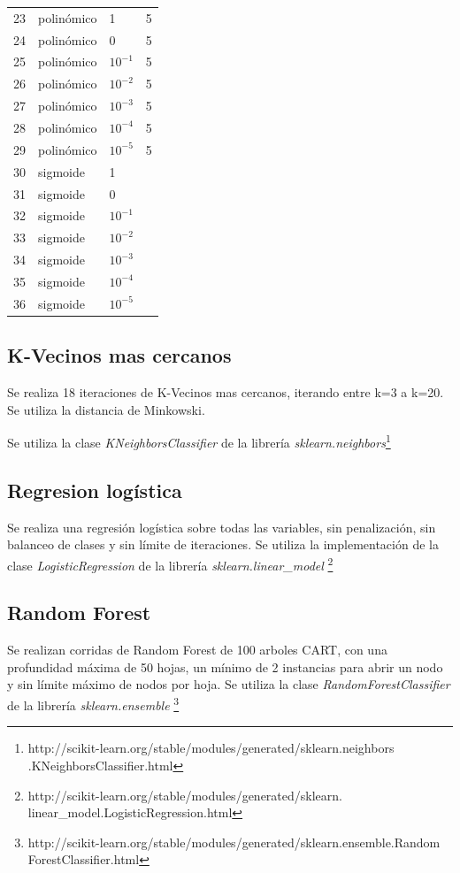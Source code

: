 \documentclass[journal]{IEEEtran}
\begin{document}
\begin{table}[ht!]
\begin{tabular}{l | l l l }
23 & polinómico & 1  & 5 \\ 
24 & polinómico & 0  & 5 \\ 
25 & polinómico & $ 10^{-1} $  & 5 \\ 
26 & polinómico & $ 10^{-2} $  & 5 \\ 
27 & polinómico & $ 10^{-3} $  & 5 \\ 
28 & polinómico & $ 10^{-4} $  & 5 \\ 
29 & polinómico & $ 10^{-5} $  & 5 \\ 
30 & sigmoide & 1 &  \\ 
31 & sigmoide & 0 &  \\ 
32 & sigmoide & $ 10^{-1} $ &  \\ 
33 & sigmoide & $ 10^{-2} $ &  \\ 
34 & sigmoide & $ 10^{-3} $ &  \\ 
35 & sigmoide & $ 10^{-4} $ &  \\ 
36 & sigmoide & $ 10^{-5} $ &  \\ 
\end{tabular}
\end{table}

\subsection{K-Vecinos mas cercanos}
Se realiza 18 iteraciones de K-Vecinos mas cercanos, iterando entre k=3
a k=20. Se utiliza la distancia de Minkowski.

Se utiliza la clase \textit{KNeighborsClassifier} de la librería
\textit{sklearn.neighbors}\footnote
{http://scikit-learn.org/stable/modules/generated/sklearn.neighbors
.KNeighborsClassifier.html}

\subsection{Regresion logística}
Se realiza una regresión logística sobre todas las variables, sin penalización,
sin balanceo de clases y sin límite de iteraciones. Se utiliza la
implementación de la clase \textit{LogisticRegression} de la librería
\textit{sklearn.linear\_model}
\footnote{http://scikit-learn.org/stable/modules/generated/sklearn.
linear\_model.LogisticRegression.html}

\subsection{Random Forest}
Se realizan corridas de Random Forest de 100 arboles CART, con una 
profundidad máxima de 50 hojas, un mínimo de 2 instancias para abrir
un nodo y sin límite máximo de nodos por hoja. Se utiliza la clase
\textit{RandomForestClassifier} de la librería \textit{sklearn.ensemble}
\footnote{http://scikit-learn.org/stable/modules/generated/sklearn.ensemble.Random
ForestClassifier.html}
\end{document}
